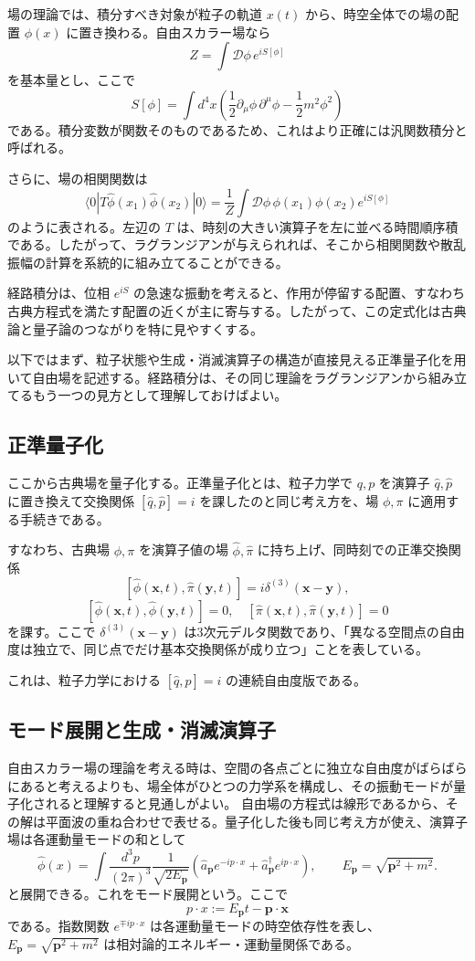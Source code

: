 場の理論では、積分すべき対象が粒子の軌道 $x(t)$ から、時空全体での場の配置 $\phi(x)$ に置き換わる。自由スカラー場なら
\[
Z = \int \mathcal{D}\phi\, e^{iS[\phi]}
\]
を基本量とし、ここで
\[
S[\phi]=\int d^4x \left(
\frac{1}{2}\partial_\mu \phi \, \partial^\mu \phi - \frac{1}{2}m^2\phi^2
\right)
\]
である。積分変数が関数そのものであるため、これはより正確には汎関数積分と呼ばれる。

さらに、場の相関関数は
\[
\langle 0|T\hat{\phi}(x_1)\hat{\phi}(x_2)|0\rangle
=
\frac{1}{Z}\int \mathcal{D}\phi\, \phi(x_1)\phi(x_2)e^{iS[\phi]}
\]
のように表される。左辺の $T$ は、時刻の大きい演算子を左に並べる時間順序積である。したがって、ラグランジアンが与えられれば、そこから相関関数や散乱振幅の計算を系統的に組み立てることができる。

経路積分は、位相 $e^{iS}$ の急速な振動を考えると、作用が停留する配置、すなわち古典方程式を満たす配置の近くが主に寄与する。したがって、この定式化は古典論と量子論のつながりを特に見やすくする。

以下ではまず、粒子状態や生成・消滅演算子の構造が直接見える正準量子化を用いて自由場を記述する。経路積分は、その同じ理論をラグランジアンから組み立てるもう一つの見方として理解しておけばよい。

\subsection{正準量子化}
ここから古典場を量子化する。正準量子化とは、粒子力学で $q,p$ を演算子 $\hat{q},\hat{p}$ に置き換えて交換関係 $[\hat{q},\hat{p}] = i$ を課したのと同じ考え方を、場 $\phi,\pi$ に適用する手続きである。

すなわち、古典場 $\phi,\pi$ を演算子値の場 $\hat{\phi},\hat{\pi}$ に持ち上げ、同時刻での正準交換関係
\[
[\hat{\phi}(\mathbf{x},t), \hat{\pi}(\mathbf{y},t)] = i\delta^{(3)}(\mathbf{x}-\mathbf{y}),
\]
\[
[\hat{\phi}(\mathbf{x},t), \hat{\phi}(\mathbf{y},t)] = 0, \quad
[\hat{\pi}(\mathbf{x},t), \hat{\pi}(\mathbf{y},t)] = 0
\]
を課す。ここで $\delta^{(3)}(\mathbf{x}-\mathbf{y})$ は3次元デルタ関数であり、「異なる空間点の自由度は独立で、同じ点でだけ基本交換関係が成り立つ」ことを表している。

これは、粒子力学における $[\hat{q},\hat{p}] = i$ の連続自由度版である。

\subsection{モード展開と生成・消滅演算子}
自由スカラー場の理論を考える時は、空間の各点ごとに独立な自由度がばらばらにあると考えるよりも、場全体がひとつの力学系を構成し、その振動モードが量子化されると理解すると見通しがよい。
自由場の方程式は線形であるから、その解は平面波の重ね合わせで表せる。量子化した後も同じ考え方が使え、演算子場は各運動量モードの和として
\[
\hat{\phi}(x) =
\int \frac{d^3p}{(2\pi)^3}\frac{1}{\sqrt{2E_{\mathbf{p}}}}
\left(
\hat{a}_{\mathbf{p}} e^{-ip\cdot x}
+ \hat{a}_{\mathbf{p}}^\dagger e^{ip\cdot x}
\right),
\qquad
E_{\mathbf{p}} = \sqrt{\mathbf{p}^2 + m^2}.
\]
と展開できる。これをモード展開という。ここで
\[
p\cdot x := E_{\mathbf{p}}t-\mathbf{p}\cdot\mathbf{x}
\]
である。指数関数 $e^{\mp ip\cdot x}$ は各運動量モードの時空依存性を表し、$E_{\mathbf{p}} = \sqrt{\mathbf{p}^2 + m^2}$ は相対論的エネルギー・運動量関係である。

